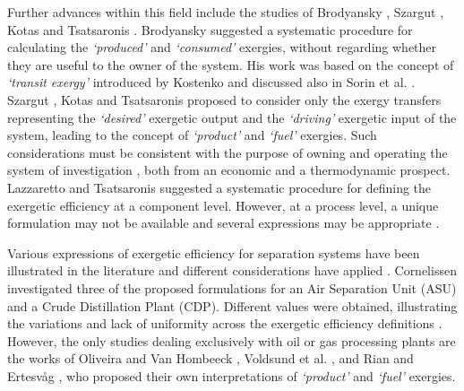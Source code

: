 Further advances within this field include the studies of Brodyansky \cite{Brodyansky1994}, Szargut \cite{Szargut1988,Morris1994,Szargut1998}, Kotas \cite{Kotas1995} and Tsatsaronis \cite{Tsatsaronis1993,Thermoeconomics2001}. Brodyansky \cite{Brodyansky1994} suggested a systematic procedure for calculating the \emph{`produced'} and \emph{`consumed'} exergies, without regarding whether they are useful to the owner of the system. His work was based on the concept of \emph{`transit exergy'} introduced by Kostenko \cite{Kostenko1983} and discussed also in Sorin et al. \cite{Sorin1994}. Szargut \cite{Szargut1988,Morris1994,Szargut1998}, Kotas \cite{Kotas1995} and Tsatsaronis \cite{Tsatsaronis1993,Thermoeconomics2001} proposed to consider only the exergy transfers representing the \emph{`desired'} exergetic output and the \emph{`driving'} exergetic input of the system, leading to the concept of  \emph{`product'} and \emph{`fuel'} exergies. Such considerations must be consistent with the purpose of owning and operating the system of investigation \cite{Kotas1980,Kotas1980a,BejanAdrian;TsatsaronisGeorge;Moran1996,Moran1998}, both from an economic and a thermodynamic prospect. Lazzaretto and Tsatsaronis \cite{Lazzaretto1999,Lazzaretto2006} suggested a systematic procedure for defining the exergetic efficiency at a component level. However, at a process level, a unique formulation may not be available and several expressions may be appropriate \cite{Tsatsaronis1993}.

Various expressions of exergetic efficiency for separation systems have been illustrated in the literature and different considerations have applied \cite{Brodyansky1994,Kotas1995,Tsatsaronis1993,Sorin1994a}. Cornelissen \cite{Cornelissen1997} investigated three of the proposed formulations for an Air Separation Unit (ASU) and a Crude Distillation Plant (CDP). Different values were obtained, illustrating the variations and lack of uniformity across the exergetic efficiency definitions \cite{Baehr1965,Baehr1968,Lior2007}. However, the only studies dealing exclusively with oil or gas processing plants are the works of Oliveira and Van Hombeeck \cite{Oliveira1997}, Voldsund et al. \cite{Voldsund2010,Voldsund2012}, and Rian and Ertesv\aa g \cite{Rian2012}, who proposed their own interpretations of \emph{`product'} and \emph{`fuel'} exergies.

